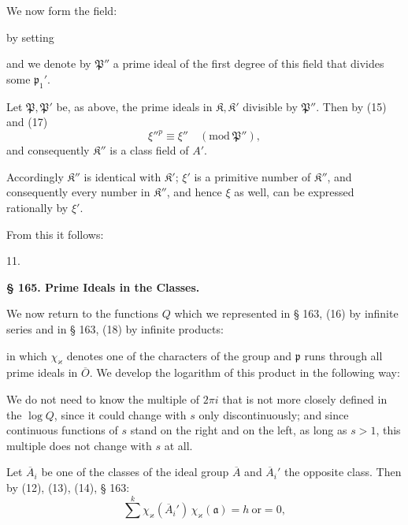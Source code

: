 We now form the field:


by setting


and we denote by $\mathfrak{P}''$ a prime ideal of the first degree of this field
that divides some $\mathfrak{p}_1'$.

Let $\mathfrak{P}, \mathfrak{P}'$ be, as above, the prime ideals in
$\mathfrak{K}, \mathfrak{K}'$ divisible by $\mathfrak{P}''$. Then by (15) and (17)
\[
\xi''^{p} \equiv \xi'' \quad (\mathrm{mod}\ \mathfrak{P}''),
\]
and consequently $\mathfrak{K}''$ is a class field of $A'$.

Accordingly $\mathfrak{K}''$ is identical with $\mathfrak{K}'$; $\xi'$ is a primitive number
of $\mathfrak{K}''$, and consequently every number in $\mathfrak{K}''$, and hence $\xi$ as well, can be
expressed rationally by $\xi'$.

From this it follows:

11. 

\begin{center}
\textbf{§ 165. Prime Ideals in the Classes.}
\end{center}

We now return to the functions $Q$ which we represented in
§ 163, (16) by infinite series and in § 163, (18) by
infinite products:


in which $\chi_{\varkappa}$ denotes one of the characters of the group
and $\mathfrak{p}$ runs through all prime ideals in $\overline{O}$. We develop the logarithm
 of this product in the following way:


We do not need to know the multiple of $2\pi i$ that is not more closely defined
in the $\log Q$, since it could change with $s$ only discontinuously; and since
continuous functions of $s$ stand on the right and on the left, as long
as $s > 1$, this multiple does not change with $s$ at
 all.

Let $\overline{A}_i$ be one of the classes of the ideal group $\overline{A}$ and $\overline{A}_i'$ the
opposite class. Then by (12), (13), (14), § 163:
\[
\overset{k}{\sum} \chi_{\varkappa}(\overline{A}_i')\,\chi_{\varkappa}(\mathfrak{a}) = h \ \text{or} = 0,
\]
